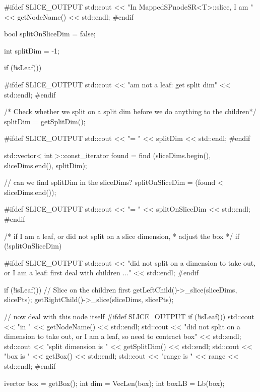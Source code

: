 \begin{DoxyCode}
  {
    #ifdef SLICE_OUTPUT
      std::cout << "In MappedSPnodeSR<T>::slice, I am " << getNodeName() << 
      std::endl;
    #endif
    
    bool splitOnSliceDim = false;
    
    int splitDim = -1;
    
    if (!isLeaf()) {
      
      #ifdef SLICE_OUTPUT
        std::cout << "\tI am not a leaf: get split dim" << std::endl;
      #endif
      
      /* Check whether we split on a split dim
        before we do anything to the children*/
      splitDim = getSplitDim();
      
      #ifdef SLICE_OUTPUT
        std::cout << "\tsplitDim = " << splitDim << std::endl;
      #endif
      
      std::vector< int >::const_iterator found 
        = find (sliceDims.begin(), sliceDims.end(), splitDim);
    
      // can we find splitDim in the sliceDims?
      splitOnSliceDim = (found < sliceDims.end()); 
      
      #ifdef SLICE_OUTPUT
        std::cout << "\tsplitOnSliceDim = " << splitOnSliceDim << std::endl;
      #endif 
    }
    
    /* if I am a leaf, or did not split on a slice dimension,
     * adjust the box */ 
    if (!splitOnSliceDim) {
      
      #ifdef SLICE_OUTPUT
        std::cout << "\tI did not split on a dimension to take out, or I am a
       leaf: first deal with children ..." << std::endl;
      #endif
      
      if (!isLeaf()) {
        // Slice on the children first
        getLeftChild()->_slice(sliceDims, slicePts);
        getRightChild()->_slice(sliceDims, slicePts);
      }
      
      // now deal with this node itself
      #ifdef SLICE_OUTPUT
        if (!isLeaf()) {
          std::cout << "\nback in " << getNodeName() << std::endl;
          std::cout << "\tI did not split on a dimension to take out, or I am a
       leaf, so need to contract box" << std::endl;
        }
        std::cout << "\tmy split dimension is " << getSplitDim() << std::endl;
        std::cout << "\tmy box is " << getBox() << std::endl;
        std::cout << "\tmy range is " << range << std::endl;
      #endif
      
      ivector box = getBox();
      int dim = VecLen(box);
      int boxLB = Lb(box);
    
}}
\end{DoxyCode}
